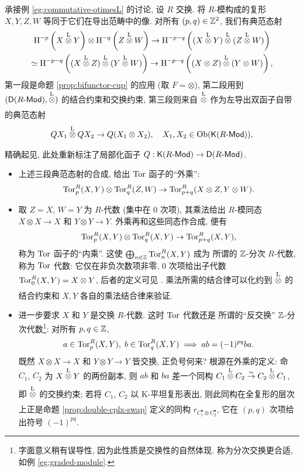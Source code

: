 \begin{example}
	承接例 \ref{eg:commutative-otimesL} 的讨论, 设 $R$ 交换. 将 $R$-模构成的复形 $X, Y, Z, W$ 等同于它们在导出范畴中的像. 对所有 $(p,q) \in \mathbb{Z}^2$, 我们有典范态射
	\begin{multline*}
		\operatorname{H}^{-p}\left( X \underset{}{\overset{\mathrm{L}}{\otimes}} Y \right) \otimes \operatorname{H}^{-q}\left( Z \underset{}{\overset{\mathrm{L}}{\otimes}} W \right) \to \operatorname{H}^{-p-q}\left( (X \underset{}{\overset{\mathrm{L}}{\otimes}} Y) \underset{}{\overset{\mathrm{L}}{\otimes}} (Z \underset{}{\overset{\mathrm{L}}{\otimes}} W) \right) \\
		\simeq \operatorname{H}^{-p-q}\left( (X \underset{}{\overset{\mathrm{L}}{\otimes}} Z) \underset{}{\overset{\mathrm{L}}{\otimes}} (Y \underset{}{\overset{\mathrm{L}}{\otimes}} W) \right) \to \operatorname{H}^{-p-q} \left( (X \otimes Z) \underset{}{\overset{\mathrm{L}}{\otimes}} (Y \otimes W) \right),
	\end{multline*}
	第一段是命题 \ref{prop:bifunctor-cup} 的应用 (取 $F = \otimes$), 第二段用到 $(\mathsf{D}(R\text{-}\mathsf{Mod}), \underset{}{\overset{\mathrm{L}}{\otimes}})$ 的结合约束和交换约束, 第三段则来自 $\underset{}{\overset{\mathrm{L}}{\otimes}}$ 作为左导出双函子自带的典范态射
	\[ QX_1 \underset{}{\overset{\mathrm{L}}{\otimes}} QX_2 \to Q(X_1 \otimes X_2), \quad X_1, X_2 \in \operatorname{Ob}(\mathsf{K}(R\text{-}\mathsf{Mod})), \]
	精确起见, 此处重新标注了局部化函子 $Q: \mathsf{K}(R\text{-}\mathsf{Mod}) \to \mathsf{D}(R\text{-}\mathsf{Mod})$.
	\begin{itemize}
		\item 上述三段典范态射的合成, 给出 $\operatorname{Tor}$ 函子的``外乘'':
		\[ \operatorname{Tor}^R_p(X, Y) \otimes \operatorname{Tor}^R_q(Z, W) \to \operatorname{Tor}^R_{p+q}(X \otimes Z, Y \otimes W). \]
		\item 取 $Z=X$, $W=Y$ 为 $R$-代数 (集中在 $0$ 次项), 其乘法给出 $R$-模同态 $X \otimes X \to X$ 和 $Y \otimes Y \to Y$. 外乘再和这些同态作合成, 便有
		\[ \operatorname{Tor}^R_p(X, Y) \otimes \operatorname{Tor}^R_q(X, Y) \to \operatorname{Tor}^R_{p+q}(X,Y), \]
		称为 $\operatorname{Tor}$ 函子的``内乘''. 这使 $\bigoplus_{n \in \mathbb{Z}} \operatorname{Tor}^R_n(X, Y)$ 成为 \cite[定义 7.4.1]{Li1} 所谓的 $\mathbb{Z}$-分次 $R$-代数, 称为 $\operatorname{Tor}$ 代数: 它仅在非负次数项非零, $0$ 次项给出子代数 $\operatorname{Tor}^R_0(X, Y) = X \otimes Y$, 后者的定义可见 \cite[定义 7.3.1]{Li1}. 乘法所需的结合律可以化约到 $\underset{}{\overset{\mathrm{L}}{\otimes}}$ 的结合约束和 $X, Y$ 各自的乘法结合律来验证.
		\item 进一步要求 $X$ 和 $Y$ 是交换 $R$-代数. 这时 $\operatorname{Tor}$ 代数还是 \cite[定义 7.4.3]{Li1} 所谓的``反交换'' $\mathbb{Z}$-分次代数\footnote{字面意义稍有误导性, 因为此性质是交换性的自然体现. 称为分次交换更合适, 如例 \ref{eg:graded-module}.}: 对所有 $p, q \in \mathbb{Z}$,
		\[ a \in \operatorname{Tor}^R_p(X, Y), \; b \in \operatorname{Tor}^R_q(X, Y) \implies ab = (-1)^{pq} ba. \]
		既然 $X \otimes X \to X$ 和 $Y \otimes Y \to Y$ 皆交换, 正负号何来? 根源在外乘的定义: 命 $C_1$, $C_2$ 为 $X \underset{}{\overset{\mathrm{L}}{\otimes}} Y$ 的两份副本, 则 $ab$ 和 $ba$ 差一个同构 $C_1 \underset{}{\overset{\mathrm{L}}{\otimes}} C_2 \stackrel{\sim}{\rightarrow} C_2 \underset{}{\overset{\mathrm{L}}{\otimes}} C_1$, 即 $\underset{}{\overset{\mathrm{L}}{\otimes}}$ 的交换约束; 若将 $C_1$, $C_2$ 以 K-平坦复形表出, 则此同构在全复形的层次上正是命题 \ref{prop:double-cplx-swap} 定义的同构 $r_{C_1^\bullet \otimes C_2^\bullet}$, 它在 $(p,q)$ 次项给出符号 $(-1)^{pq}$.
	\end{itemize}
\end{example}

